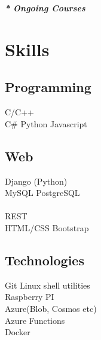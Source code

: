 \documentclass[]{deedy-resume-openfont}
\begin{document}
\begin{minipage}[t]{0.30\textwidth}
{\footnotesize \textit{\textbf{* Ongoing Courses}}}
\sectionsep


\section{Skills}
\subsection{Programming}
\textbullet{}   C/C++  \\
\textbullet{} C\# 
\textbullet{} Python 
\textbullet{} Javascript 

\sectionsep

\subsection{Web}
\textbullet{} Django (Python) \\ \textbullet{} MySQL 
\textbullet{} PostgreSQL \\  \\ \textbullet{} REST \\ 
\textbullet{} HTML/CSS \textbullet{} Bootstrap \\ 
\sectionsep

\subsection{Technologies}
\textbullet{} Git \textbullet{} Linux shell utilities \\
\textbullet{} Raspberry PI \\
\textbullet{} Azure(Blob, Cosmos etc) \\
\textbullet{} Azure Functions \\
\textbullet{} Docker  \\
\textbullet{}  \\


\end{minipage}
\end{document}
